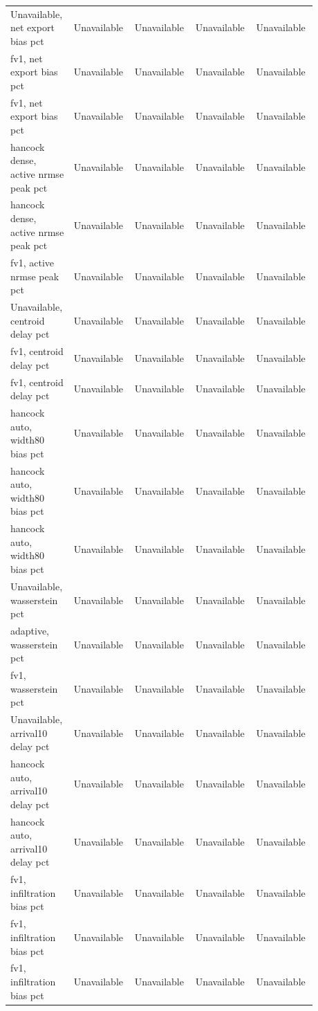 \begin{longtable}{p{0.1760\linewidth}p{0.1760\linewidth}p{0.1760\linewidth}p{0.1760\linewidth}p{0.1760\linewidth}}
Unavailable, net export bias pct & Unavailable & Unavailable & Unavailable & Unavailable \\
fv1, net export bias pct & Unavailable & Unavailable & Unavailable & Unavailable \\
fv1, net export bias pct & Unavailable & Unavailable & Unavailable & Unavailable \\
hancock dense, active nrmse peak pct & Unavailable & Unavailable & Unavailable & Unavailable \\
hancock dense, active nrmse peak pct & Unavailable & Unavailable & Unavailable & Unavailable \\
fv1, active nrmse peak pct & Unavailable & Unavailable & Unavailable & Unavailable \\
Unavailable, centroid delay pct & Unavailable & Unavailable & Unavailable & Unavailable \\
fv1, centroid delay pct & Unavailable & Unavailable & Unavailable & Unavailable \\
fv1, centroid delay pct & Unavailable & Unavailable & Unavailable & Unavailable \\
hancock auto, width80 bias pct & Unavailable & Unavailable & Unavailable & Unavailable \\
hancock auto, width80 bias pct & Unavailable & Unavailable & Unavailable & Unavailable \\
hancock auto, width80 bias pct & Unavailable & Unavailable & Unavailable & Unavailable \\
Unavailable, wasserstein pct & Unavailable & Unavailable & Unavailable & Unavailable \\
adaptive, wasserstein pct & Unavailable & Unavailable & Unavailable & Unavailable \\
fv1, wasserstein pct & Unavailable & Unavailable & Unavailable & Unavailable \\
Unavailable, arrival10 delay pct & Unavailable & Unavailable & Unavailable & Unavailable \\
hancock auto, arrival10 delay pct & Unavailable & Unavailable & Unavailable & Unavailable \\
hancock auto, arrival10 delay pct & Unavailable & Unavailable & Unavailable & Unavailable \\
fv1, infiltration bias pct & Unavailable & Unavailable & Unavailable & Unavailable \\
fv1, infiltration bias pct & Unavailable & Unavailable & Unavailable & Unavailable \\
fv1, infiltration bias pct & Unavailable & Unavailable & Unavailable & Unavailable \\

\end{longtable}
